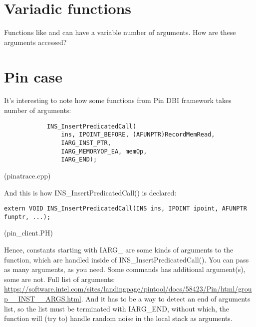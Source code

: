 \section{Variadic functions}

Functions like \printf and \scanf can have a variable number of arguments.
How are these arguments accessed?




\section{Pin case}

It's interesting to note how some functions from Pin \ac{DBI} framework takes number of arguments:

\begin{lstlisting}
            INS_InsertPredicatedCall(
                ins, IPOINT_BEFORE, (AFUNPTR)RecordMemRead,
                IARG_INST_PTR,
                IARG_MEMORYOP_EA, memOp,
                IARG_END);
\end{lstlisting}
(pinatrace.cpp)

And this is how INS_InsertPredicatedCall() is declared:

\begin{lstlisting}
extern VOID INS_InsertPredicatedCall(INS ins, IPOINT ipoint, AFUNPTR funptr, ...);
\end{lstlisting}
(pin\_client.PH)

Hence, constants starting with IARG\_ are some kinds of arguments to the function,
which are handled inside of INS\_InsertPredicatedCall().
You can pass as many arguments, as you need.
Some commands has additional argument(s), some are not.
Full list of arguments:
\url{https://software.intel.com/sites/landingpage/pintool/docs/58423/Pin/html/group__INST__ARGS.html}.
And it has to be a way to detect an end of arguments list, so the list must be terminated with IARG\_END, without which,
the function will (try to) handle random noise in the local stack as arguments.



